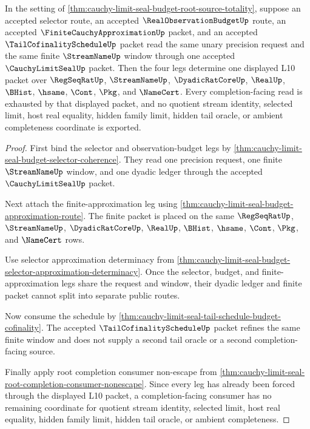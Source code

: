 \begin{theorem}
\label{thm:cauchy-limit-seal-budget-selector-totality}
In the setting of \autoref{thm:cauchy-limit-seal-budget-root-source-totality}, suppose an accepted selector route, an accepted $\RealObservationBudgetUp$ route, an accepted $\FiniteCauchyApproximationUp$ packet, and an accepted $\TailCofinalityScheduleUp$ packet read the same unary precision request and the same finite $\StreamNameUp$ window through one accepted $\CauchyLimitSealUp$ packet. Then the four legs determine one displayed L10 packet over $\RegSeqRatUp$, $\StreamNameUp$, $\DyadicRatCoreUp$, $\RealUp$, $\BHist$, $\hsame$, $\Cont$, $\Pkg$, and $\NameCert$. Every completion-facing read is exhausted by that displayed packet, and no quotient stream identity, selected limit, host real equality, hidden family limit, hidden tail oracle, or ambient completeness coordinate is exported.
\end{theorem}
\begin{proof}
First bind the selector and observation-budget legs by \autoref{thm:cauchy-limit-seal-budget-selector-coherence}. They read one precision request, one finite $\StreamNameUp$ window, and one dyadic ledger through the accepted $\CauchyLimitSealUp$ packet.

Next attach the finite-approximation leg using \autoref{thm:cauchy-limit-seal-budget-approximation-route}. The finite packet is placed on the same $\RegSeqRatUp$, $\StreamNameUp$, $\DyadicRatCoreUp$, $\RealUp$, $\BHist$, $\hsame$, $\Cont$, $\Pkg$, and $\NameCert$ rows.

Use selector approximation determinacy from \autoref{thm:cauchy-limit-seal-budget-selector-approximation-determinacy}. Once the selector, budget, and finite-approximation legs share the request and window, their dyadic ledger and finite packet cannot split into separate public routes.

Now consume the schedule by \autoref{thm:cauchy-limit-seal-tail-schedule-budget-cofinality}. The accepted $\TailCofinalityScheduleUp$ packet refines the same finite window and does not supply a second tail oracle or a second completion-facing source.

Finally apply root completion consumer non-escape from \autoref{thm:cauchy-limit-seal-root-completion-consumer-nonescape}. Since every leg has already been forced through the displayed L10 packet, a completion-facing consumer has no remaining coordinate for quotient stream identity, selected limit, host real equality, hidden family limit, hidden tail oracle, or ambient completeness.
\end{proof}

